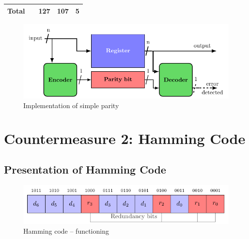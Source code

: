 \begin{table}[t]
\begin{tabular}{@{}ccccc@{}}
        Total   &                                                                                                   & 127                                                      & 107                                                                & 5                                                               \\
        \bottomrule
    \end{tabular}
\end{table}

\begin{figure}[ht]
    \centering
    \includegraphics[page=1]{c5_countermeasures_dift/img/archi_contremesures.pdf}
    \caption{Implementation of simple parity}
    \label{fig:implementation_sp}
\end{figure}


\section{Countermeasure 2: Hamming Code}
\label{chapter:hammingcode}

\subsection{Presentation of Hamming Code}

\begin{figure}[ht]
    \centering
    \includegraphics[page=1]{c5_countermeasures_dift/img/hamming_bit.pdf}
    \caption{Hamming code -- functioning}
    \label{fig:hamming_functionning}
\end{figure}

